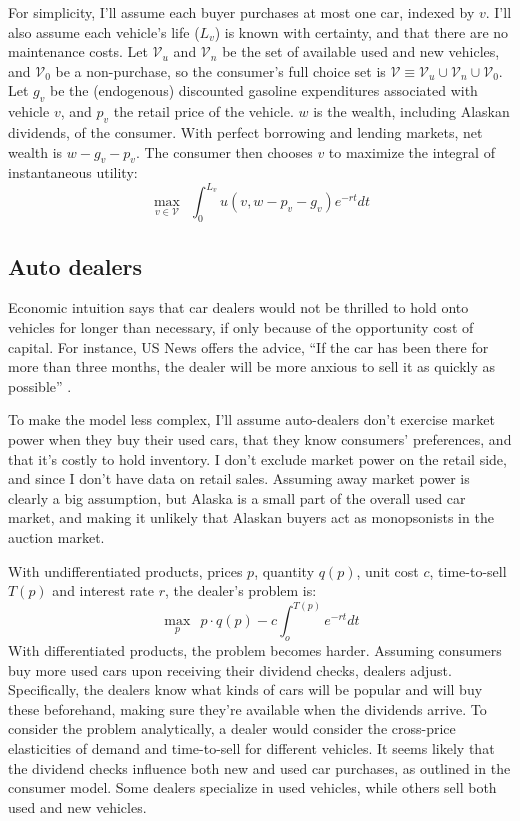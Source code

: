 \documentclass[11pt,letterpaper,oneside]{article}
\begin{document}
\begin{doublespacing}
For simplicity, I'll assume each buyer purchases at most one car, indexed by $v$.
I'll also assume each vehicle's life ($L_v$) is known with certainty, and that there are no maintenance costs.
Let $\mathcal{V}_u$ and $\mathcal{V}_n$ be the set of available used and new vehicles, and $\mathcal{V}_0$ be a non\hyp{}purchase, so the consumer's full choice set is $\mathcal{V} \equiv \mathcal{V}_u \cup \mathcal{V}_n \cup \mathcal{V}_0$.
Let $g_v$ be the (endogenous) discounted gasoline expenditures associated with vehicle $v$, and $p_v$ the retail price of the vehicle.
$w$ is the wealth, including Alaskan dividends, of the consumer.
With perfect borrowing and lending markets, net wealth is $w - g_v - p_v$.
The consumer then chooses $v$ to maximize the integral of instantaneous utility:
\[
\max_{v \in \mathcal{V}} \ \ \int_0^{L_v} u(v, w - p_v - g_v) e^{-rt} dt
\]

\subsection{Auto dealers}

Economic intuition says that car dealers would not be thrilled to hold onto vehicles for longer than necessary, if only because of the opportunity cost of capital.
For instance, US News offers the advice, ``If the car has been there for more than three months, the dealer will be more anxious to sell it as quickly as possible''
\parencite{usnews_car_deals}.

To make the model less complex, I'll assume auto\hyp{}dealers don't exercise market power when they buy their used cars, that they know consumers' preferences, and that it's costly to hold inventory.
I don't exclude market power on the retail side, and since I don't have data on retail sales.
Assuming away market power is clearly a big assumption, but Alaska is a small part of the overall used car market, and making it unlikely that Alaskan buyers act as monopsonists in the auction market.

With undifferentiated products, prices $p$, quantity $q(p)$, unit cost $c$, time-to-sell $T(p)$ and interest rate $r$, the dealer's problem is:
\[
\max_p \ \ p \cdot q(p) - c \int_o^{T(p)} e^{-rt}dt
\]
With differentiated products, the problem becomes harder.
Assuming consumers buy more used cars upon receiving their dividend checks, dealers adjust.
Specifically, the dealers know what kinds of cars will be popular and will buy these beforehand, making sure they're available when the dividends arrive.
To consider the problem analytically, a dealer would consider the cross-price elasticities of demand and time-to-sell for different vehicles.
It seems likely that  the dividend checks influence both new and used car purchases, as outlined in the consumer model.
Some dealers specialize in used vehicles, while others sell both used and new vehicles.


\end{doublespacing}
\end{document}
